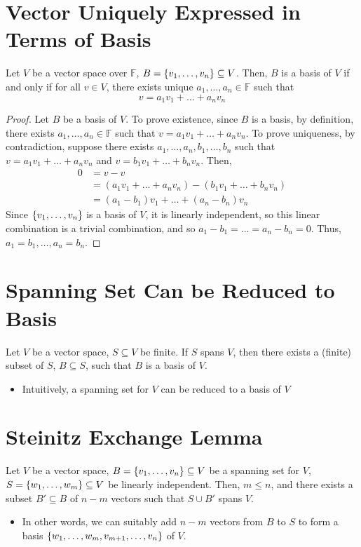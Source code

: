 \documentclass[letterpaper,12pt]{article}
\begin{document}
\section*{Vector Uniquely Expressed in Terms of Basis}
\begin{theorem}
Let $V$ be a vector space over $\mathbb{F}$, $B = \left\{ v_1, \dots, v_n \right\} \subseteq V$. Then, $B$ is a basis of $V$ if and only if for all $v \in V$, there exists unique $a_1, \dots, a_n \in \mathbb{F}$ such that
\begin{equation*}
    v = a_1 v_1 + \dots + a_n v_n
\end{equation*}
\end{theorem}
\begin{proof}
Let $B$ be a basis of $V$. To prove existence, since $B$ is a basis, by definition, there exists $a_1, \dots, a_n \in \mathbb{F}$ such that $v = a_1 v_1 + \dots + a_n v_n$. To prove uniqueness, by contradiction, suppose there exists $a_1, \dots, a_n, b_1, \dots, b_n$ such that $v = a_1 v_1 + \dots + a_n v_n$ and $v = b_1 v_1 + \dots + b_n v_n$. Then,
\begin{align*}
    0 & = v - v \\
    & = (a_1 v_1 + \dots + a_n v_n) - (b_1 v_1 + \dots + b_n v_n) \\
    & = (a_1 - b_1) v_1 + \dots + (a_n - b_n) v_n
\end{align*}
Since $\left\{ v_1, \dots, v_n \right\}$ is a basis of $V$, it is linearly independent, so this linear combination is a trivial combination, and so $a_1 - b_1 = \dots = a_n - b_n = 0$. Thus, $a_1 = b_1, \dots, a_n = b_n$.
\end{proof}

\section*{Spanning Set Can be Reduced to Basis}
\begin{theorem}
Let $V$ be a vector space, $S \subseteq V$ be finite. If $S$ spans $V$, then there exists a (finite) subset of $S$, $B \subseteq S$, such that $B$ is a basis of $V$.
\begin{itemize}
    \item Intuitively, a spanning set for $V$ can be reduced to a basis of $V$
\end{itemize}
\end{theorem}

\section*{Steinitz Exchange Lemma}
\begin{theorem}
Let $V$ be a vector space, $B = \left\{ v_1, \dots, v_n \right\} \subseteq V$ be a spanning set for $V$, $S = \left\{ w_1, \dots, w_m \right\} \subseteq V$ be linearly independent. Then, $m \leq n$, and there exists a subset $B' \subseteq B$ of $n - m$ vectors such that $S \cup B'$ spans $V$.
\begin{itemize}
    \item In other words, we can suitably add $n - m$ vectors from $B$ to $S$ to form a basis $\left\{ w_1, \dots, w_m, v_{m+1}, \dots, v_n \right\}$ of $V$.
\end{itemize}
\end{theorem}
\end{document}
